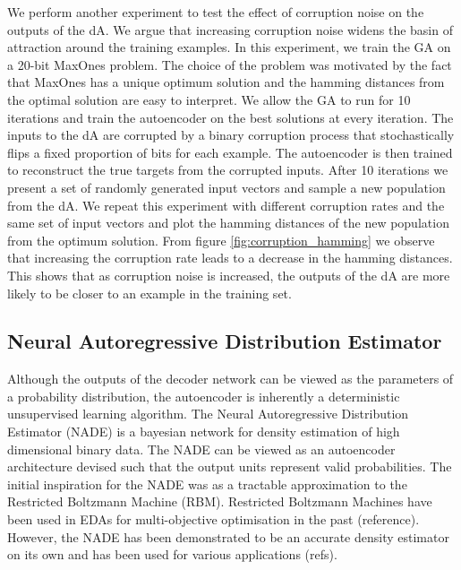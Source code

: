 \documentclass[twoside]{article}
\begin{document}
We perform another experiment to test the effect of corruption noise on the outputs of the dA. We argue that increasing corruption noise widens the basin of attraction around the training examples. In this experiment, we train the GA on a 20-bit MaxOnes problem. The choice of the problem was motivated by the fact that MaxOnes has a unique optimum solution and the hamming distances from the optimal solution are easy to interpret. We allow the GA to run for 10 iterations and train the autoencoder on the best solutions at every iteration. The inputs to the dA are corrupted by a binary corruption process that stochastically flips a fixed proportion of bits for each example. The autoencoder is then trained to reconstruct the true targets from the corrupted inputs. After 10 iterations we present a set of randomly generated input vectors and sample a new population from the dA. We repeat this experiment with different corruption rates and the same set of input vectors and  plot the hamming distances of the new population from the optimum solution. From figure \ref{fig:corruption_hamming} we observe that increasing the corruption rate leads to a decrease in the hamming distances. This shows that as corruption noise is increased, the outputs of the dA are more likely to be closer to an example in the training set.

\subsection{Neural Autoregressive Distribution Estimator}

Although the outputs of the decoder network can be viewed as the parameters of a probability distribution, the autoencoder is inherently a deterministic unsupervised learning algorithm. The Neural Autoregressive Distribution Estimator (NADE) is a bayesian network for density estimation of high dimensional binary data. The NADE can be viewed as an autoencoder architecture devised such that the output units represent valid probabilities. The initial inspiration for the NADE was as a tractable approximation to the Restricted Boltzmann Machine (RBM). Restricted Boltzmann Machines have been used in EDAs for multi-objective optimisation in the past (reference). However, the NADE has been demonstrated to be an accurate density estimator on its own and has been used for various applications (refs). 
\end{document}
